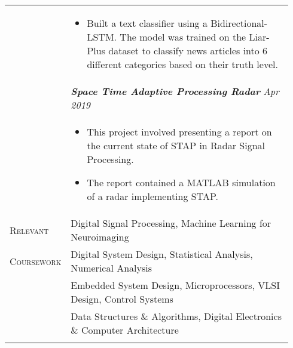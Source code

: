 \documentclass[letterpaper, 10pt, oneside]{article}
\newcommand{\stitle}[1]{\normalsize{\textsc{#1}}}
\newcommand{\bdit}[1]{\textit{\textbf{#1}}}
\begin{document}
\begin{longtable}{@{} p{0.14\linewidth} p{0.8\linewidth}}
                  & \parbox{0.8\textwidth}{
                        \begin{itemize}[leftmargin=*, itemsep=-0.88ex]
                            \item Built a text classifier using a Bidirectional-LSTM. 
                                  The model was trained on the Liar-Plus dataset to classify news articles into 
                                  6 different categories based on their truth level.
                        \end{itemize}
                    }  
\\
                  & \bdit{Space Time Adaptive Processing Radar} \hfill \textit{Apr 2019} \\
                  & \parbox{0.8\textwidth}{
                        \begin{itemize}[leftmargin=*, itemsep=-0.88ex]
                            \item This project involved presenting a report on the current state of STAP in Radar Signal Processing.
                            \item The report contained a MATLAB simulation of a radar implementing STAP.
                        \end{itemize}
                    }  
\\


\stitle{Relevant}   & Digital Signal Processing, Machine Learning for Neuroimaging \\
\stitle{Coursework} & Digital System Design, Statistical Analysis, Numerical Analysis \\
                    & Embedded System Design, Microprocessors, VLSI Design, Control Systems \\
                    & Data Structures \& Algorithms, Digital Electronics \& Computer Architecture \\
\\








\end{longtable}
\end{document}
